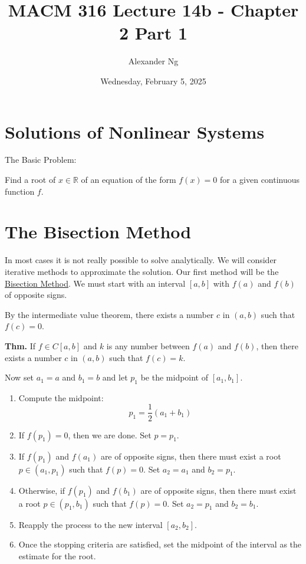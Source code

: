 \documentclass[12pt]{article}
\newcommand{\thm}{\textbf{Thm.}\xspace}
\begin{document}
\title{MACM 316 Lecture 14b - Chapter 2 Part 1}
\author{Alexander Ng}
\date{Wednesday, February 5, 2025}

\maketitle

\section{Solutions of Nonlinear Systems}

The Basic Problem:

Find a root of $x\in\mathbb{R}$ of an equation of the form $f(x)=0$ for a
given continuous function $f$.

\section{The Bisection Method}

In most cases it is not really possible to solve analytically. We will consider
iterative methods to approximate the solution. Our first method will be the
\uline{Bisection Method}. We must start with an interval $[a, b]$ with 
$f(a)$ and $f(b)$ of opposite signs.

By the intermediate value theorem, there exists a number $c$ in $(a, b)$ such that
$f(c)=0$.

\thm If $f\in C[a,b]$ and $k$ is any number between $f(a)$ and $f(b)$, then
there exists a number $c$ in $(a, b)$ such that $f(c)=k$.

Now set $a_1 = a$ and $b_1 = b$ and let $p_1$ be the midpoint of $[a_1, b_1]$.

\begin{enumerate}
    \item Compute the midpoint:
    \begin{equation*}
        p_1 = \frac{1}{2} (a_1 + b_1)
    \end{equation*}
    
    \item If $f(p_1) = 0$, then we are done. Set $p = p_1$.
    
    \item If $f(p_1)$ and $f(a_1)$ are of opposite signs, then there must exist 
          a root $p \in (a_1, p_1)$ such that $f(p) = 0$. Set $a_2 = a_1$ and 
          $b_2 = p_1$.
    
    \item Otherwise, if $f(p_1)$ and $f(b_1)$ are of opposite signs, then there 
          must exist a root $p \in (p_1, b_1)$ such that $f(p) = 0$. Set 
          $a_2 = p_1$ and $b_2 = b_1$.
    
    \item Reapply the process to the new interval $[a_2, b_2]$.
    
    \item Once the stopping criteria are satisfied, set the midpoint of the 
          interval as the estimate for the root.
\end{enumerate}
\end{document}
